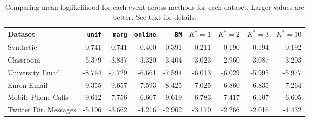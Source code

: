 \begin{table}[t]
\begin{center}
{\footnotesize
\begin{tabular}{lrrrrrrrr}
  \hline
Dataset & \texttt{unif} & \texttt{marg} & \texttt{online} & \texttt{BM} & $K^*=1$ & $K^*=2$ & $K^*=3$ & $K^*=10$ \\ 
  \hline
Synthetic & -0.741 & -0.741 & -0.400 & -0.391 & -0.211 & 0.190 & 0.194 & 0.192 \\ 
  Classroom & -5.379 & -3.837 & -3.320 & -3.404 & -3.023 & -2.960 & -3.087 & -3.203 \\ 
  University Email & -8.764 & -7.729 & -6.661 & -7.594 & -6.013 & -6.029 & -5.995 & -5.977 \\ 
  Enron Email & -9.355 & -9.657 & -7.593 & -8.425 & -7.025 & -6.860 & -6.835 & -7.264 \\ 
  Mobile Phone Calls & -9.612 & -7.756 & -6.607 & -9.619 & -6.783 & -7.417 & -6.107 & -6.605 \\ 
  Twitter Dir. Messages & -5.106 & -3.662 & -4.216 & -2.962 & -3.170 & -2.266 & -2.016 & -4.432 \\ 
   \hline
\end{tabular}
}
\caption{Comparing mean loglikelihood for each event across methods for each dataset.  Larger values are better.  See text for details.}
\label{tab:results}
\end{center}
\end{table}
